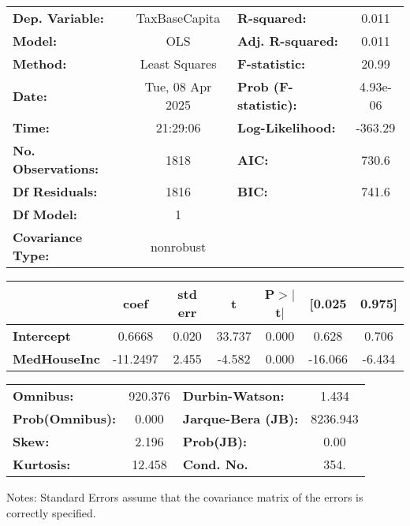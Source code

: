 \begin{center}
\begin{tabular}{lclc}
\toprule
\textbf{Dep. Variable:}    &  TaxBaseCapita   & \textbf{  R-squared:         } &     0.011   \\
\textbf{Model:}            &       OLS        & \textbf{  Adj. R-squared:    } &     0.011   \\
\textbf{Method:}           &  Least Squares   & \textbf{  F-statistic:       } &     20.99   \\
\textbf{Date:}             & Tue, 08 Apr 2025 & \textbf{  Prob (F-statistic):} &  4.93e-06   \\
\textbf{Time:}             &     21:29:06     & \textbf{  Log-Likelihood:    } &   -363.29   \\
\textbf{No. Observations:} &        1818      & \textbf{  AIC:               } &     730.6   \\
\textbf{Df Residuals:}     &        1816      & \textbf{  BIC:               } &     741.6   \\
\textbf{Df Model:}         &           1      & \textbf{                     } &             \\
\textbf{Covariance Type:}  &    nonrobust     & \textbf{                     } &             \\
\bottomrule
\end{tabular}
\begin{tabular}{lcccccc}
                     & \textbf{coef} & \textbf{std err} & \textbf{t} & \textbf{P$> |$t$|$} & \textbf{[0.025} & \textbf{0.975]}  \\
\midrule
\textbf{Intercept}   &       0.6668  &        0.020     &    33.737  &         0.000        &        0.628    &        0.706     \\
\textbf{MedHouseInc} &     -11.2497  &        2.455     &    -4.582  &         0.000        &      -16.066    &       -6.434     \\
\bottomrule
\end{tabular}
\begin{tabular}{lclc}
\textbf{Omnibus:}       & 920.376 & \textbf{  Durbin-Watson:     } &    1.434  \\
\textbf{Prob(Omnibus):} &   0.000 & \textbf{  Jarque-Bera (JB):  } & 8236.943  \\
\textbf{Skew:}          &   2.196 & \textbf{  Prob(JB):          } &     0.00  \\
\textbf{Kurtosis:}      &  12.458 & \textbf{  Cond. No.          } &     354.  \\
\bottomrule
\end{tabular}
\end{center}

Notes: \newline
 [1] Standard Errors assume that the covariance matrix of the errors is correctly specified.